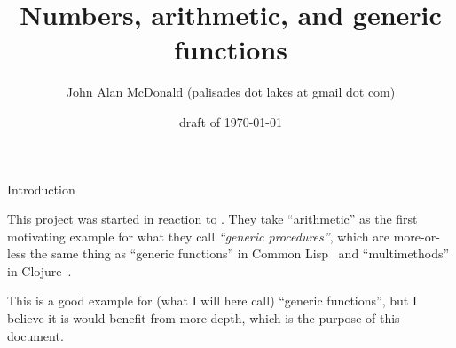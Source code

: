 \documentclass[12pt]{PalisadesLakesBook}
\title{Numbers, arithmetic, and generic functions}
\author{John Alan McDonald 
(palisades dot lakes at gmail dot com)}
\date{draft of \today}
\begin{document}
\maketitle
{}
\begin{plSection}{Introduction} 
 
This project was started in reaction to 
.
They take ``arithmetic'' as the first motivating example 
for what they call \textit{``generic procedures''},
which are more-or-less the same thing as 
``generic functions'' in Common Lisp~\cite{Steele:1990:CLTL2}
and ``multimethods'' in Clojure~\cite{Clojure:Multimethods}.

This is a good example for (what I will here call)
 ``generic functions'', 
but I believe it is would benefit from more depth,
which is the purpose of this document.

\end{plSection}%
\end{document}
